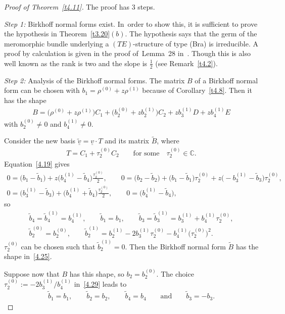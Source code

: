 \documentclass[10pt,a4paper]{amsart}
\numberwithin{equation}{section}
\numberwithin{figure}{section}
\newcommand{\C}{{\mathbb C}}
\newcommand{\www}{\widetilde}
\newcommand{\uuuu}{\underline}
\begin{document}
\begin{proof}[Proof of Theorem~\ref{t4.11}] The proof has 3 steps.

\medskip\noindent
{\it Step 1:} Birkhoff normal forms exist. In~order to show this, it is sufficient to prove
the hypothesis in Theorem~\ref{t3.20}$(b)$.
The hypothesis says that the germ of the meromorphic
bundle underlying a $(TE)$-structure of type (Bra)
is irreducible.
A proof by calculation is given in the proof of~Lemma~28
in~\cite{DH20-3}.
Though this is also well known as the rank is two
and the slope is $\frac{1}{2}$ (see Remark~\ref{t4.2}).

\medskip\noindent
{\it Step 2:} Analysis of the Birkhoff normal forms.
The matrix $B$ of a Birkhoff normal form can be chosen
with $b_1=\rho^{(0)}+z\rho^{(1)}$ because of Corollary~\ref{t4.8}. Then it has the shape
\begin{gather*}%
B= \big(\rho^{(0)}+z\rho^{(1)}\big)C_1+\big(b_2^{(0)}+zb_2^{(1)}\big)C_2
+zb_3^{(1)}D+zb_4^{(1)}E
\end{gather*}
with $b_2^{(0)}\neq 0$ and $b_4^{(1)}\neq 0$.

Consider the new basis $\uuuu{\www v}=\uuuu{v}\cdot T$
and its matrix $\www B$, where
\begin{gather}\label{4.29}
T=C_1+\tau_2^{(0)}C_2 \qquad\text{for some}\quad \tau_2^{(0)}\in\C.
\end{gather}
Equation~\eqref{4.19} gives
\begin{gather*}
0= \big(b_1-\www b_1\big)+z\big(b_4^{(1)}-\www b_4\big)\frac{\tau_2^{(0)}}{2},
\qquad
0= \big(b_2-\www b_2\big)+\big(b_1-\www b_1\big)\tau_2^{(0)}+z\big({-}b_3^{(1)}-\www b_3\big)\tau_2^{(0)},
\\
0= \big(b_3^{(1)}-\www b_3\big)+\big(b_4^{(1)}+\www b_4\big)\frac{\tau_2^{(0)}}{2},
\qquad
0= \big(b_4^{(1)}-\www b_4\big),
\end{gather*}
so
\begin{gather}
\www b_4= \www b_4^{(1)}=b_4^{(1)},\qquad
\www b_1=b_1,\qquad
\www b_3= \www b_3^{(1)}=b_3^{(1)}+b_4^{(1)}\tau_2^{(0)},
\nonumber
\\
\www b_2^{(0)}= b_2^{(0)},\qquad
\www b_2^{(1)}= b_2^{(1)}-2b_3^{(1)}\tau_2^{(0)}-b_4^{(1)}\big(\tau_2^{(0)}\big)^2.
\label{4.30}
\end{gather}
$\tau_2^{(0)}$ can be chosen such that $\www b_2^{(1)}=0$.
Then the Birkhoff normal form $\www B$ has the shape in~\eqref{4.25}.

Suppose now that $B$ has this shape, so $b_2=b_2^{(0)}$.
The choice $\tau_2^{(0)}:=-2b_3^{(1)}/b_4^{(1)}$ in~\eqref{4.29} leads to
\begin{gather}\label{4.31}
\www b_1=b_1,\qquad
\www b_2=b_2,\qquad
\www b_4=b_4\qquad\text{and}\qquad
\www b_3=-b_3.
\end{gather}


\end{proof}
\end{document}
